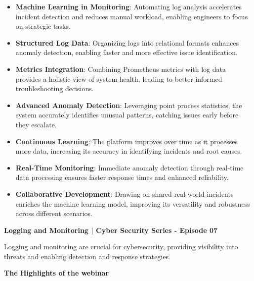 \begin{itemize}
    \item \textbf{Machine Learning in Monitoring}: Automating log analysis accelerates incident detection and reduces manual workload, enabling engineers to focus on strategic tasks.

    \item \textbf{Structured Log Data}: Organizing logs into relational formats enhances anomaly detection, enabling faster and more effective issue identification.

    \item \textbf{Metrics Integration}: Combining Prometheus metrics with log data provides a holistic view of system health, leading to better-informed troubleshooting decisions.
    
    \item \textbf{Advanced Anomaly Detection}: Leveraging point process statistics, the system accurately identifies unusual patterns, catching issues early before they escalate.
 
    \item \textbf{Continuous Learning}: The platform improves over time as it processes more data, increasing its accuracy in identifying incidents and root causes.
 
    \item \textbf{Real-Time Monitoring}: Immediate anomaly detection through real-time data processing ensures faster response times and enhanced reliability.

    \item \textbf{Collaborative Development}: Drawing on shared real-world incidents enriches the machine learning model, improving its versatility and robustness across different scenarios.
\end{itemize}
     \textbf{Logging and Monitoring | Cyber Security Series - Episode 07}

    Logging and monitoring are crucial for cybersecurity, providing visibility into threats and enabling detection and response strategies.\cite{ChessICT7}


\textbf{The Highlights of the webinar}


